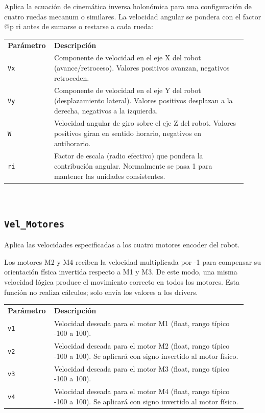 Aplica la ecuación de cinemática inversa holonómica para una configuración de cuatro ruedas mecanum o similares. La velocidad angular se pondera con el factor @p ri antes de sumarse o restarse a cada rueda:

\begin{tabular}{@{}p{0.15\linewidth}p{0.78\linewidth}@{}}
\textbf{Par\'ametro} & \textbf{Descripci\'on} \\
\texttt{Vx} & Componente de velocidad en el eje X del robot (avance/retroceso). Valores positivos avanzan, negativos retroceden. \\
\texttt{Vy} & Componente de velocidad en el eje Y del robot (desplazamiento lateral). Valores positivos desplazan a la derecha, negativos a la izquierda. \\
\texttt{W} & Velocidad angular de giro sobre el eje Z del robot. Valores positivos giran en sentido horario, negativos en antihorario. \\
\texttt{ri} & Factor de escala (radio efectivo) que pondera la contribución angular. Normalmente se pasa 1 para mantener las unidades consistentes. \\
\end{tabular}\\[4pt]

\subsection{\texttt{Vel\_Motores}}
\label{fn:VelMotores}
Aplica las velocidades especificadas a los cuatro motores encoder del robot.

Los motores M2 y M4 reciben la velocidad multiplicada por -1 para compensar su orientación física invertida respecto a M1 y M3. De este modo, una misma velocidad lógica produce el movimiento correcto en todos los motores. Esta función no realiza cálculos; solo envía los valores a los drivers.

\begin{tabular}{@{}p{0.15\linewidth}p{0.78\linewidth}@{}}
\textbf{Par\'ametro} & \textbf{Descripci\'on} \\
\texttt{v1} & Velocidad deseada para el motor M1 (float, rango típico -100 a 100). \\
\texttt{v2} & Velocidad deseada para el motor M2 (float, rango típico -100 a 100). Se aplicará con signo invertido al motor físico. \\
\texttt{v3} & Velocidad deseada para el motor M3 (float, rango típico -100 a 100). \\
\texttt{v4} & Velocidad deseada para el motor M4 (float, rango típico -100 a 100). Se aplicará con signo invertido al motor físico. \\
\end{tabular}\\[4pt]

